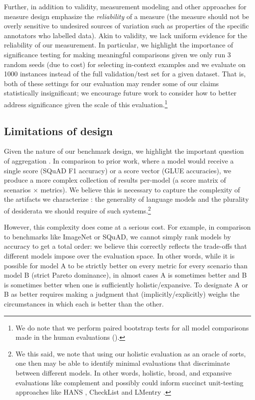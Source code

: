 Further, in addition to validity, measurement modeling and other approaches for measure design emphasize the \textit{reliability} of a measure (\ie the measure should not be overly sensitive to undesired sources of variation such as properties of the specific annotators who labelled data).
Akin to validity, we lack uniform evidence for the reliability of our measurement.
In particular, we highlight the importance of significance testing for making meaningful comparisons given we only run 3 random seeds (due to cost) for selecting in-context examples and we evaluate on 1000 instances instead of the full validation/test set for a given dataset.
That is, both of these settings for our evaluation may render some of our claims statistically insignificant; we encourage future work to consider how to better address significance given the scale of this evaluation.\footnote{We do note that we perform paired bootstrap tests for all model comparisons made in the human evaluations ().} 



\subsection{Limitations of \benchmarkname design}
Given the nature of our benchmark design, we highlight the important question of aggregation \citep[see][]{ethayarajh2020utility, ma2021dynaboard}.
In comparison to prior work, where a model would receive a single score (\eg SQuAD F1 accuracy) or a score vector (\eg GLUE accuracies), we produce a more complex collection of results per-model (\ie a score matrix of scenarios $\times$ metrics). 
We believe this is necessary to capture the complexity of the artifacts we characterize \citep{liao2021are}: the generality of language models and the plurality of desiderata we should require of such systems.\footnote{We this said, we note that using our holistic evaluation as an oracle of sorts, one then may be able to identify minimal evaluations that discriminate between different models. In other words, holistic, broad, and expansive evaluations like \benchmarkname  complement and possibly could inform succinct unit-testing approaches like HANS \citep{mccoy2019right}, CheckList \citep{ribeiro2020beyond} and LMentry \citep{efrat2022lmentry}.} 

However, this complexity does come at a serious cost.
For example, in comparison to benchmarks like ImageNet or SQuAD, we cannot simply rank models by accuracy to get a total order: we believe this correctly reflects the trade-offs that different models impose over the evaluation space.
In other words, while it is possible for model A to be strictly better on every metric for every scenario than model B (\ie strict Pareto dominance), in almost cases A is sometimes better and B is sometimes better when one is sufficiently holistic/expansive.
To designate A or B as better requires making a judgment that (implicitly/explicitly) weighs the circumstances in which each is better than the other.

